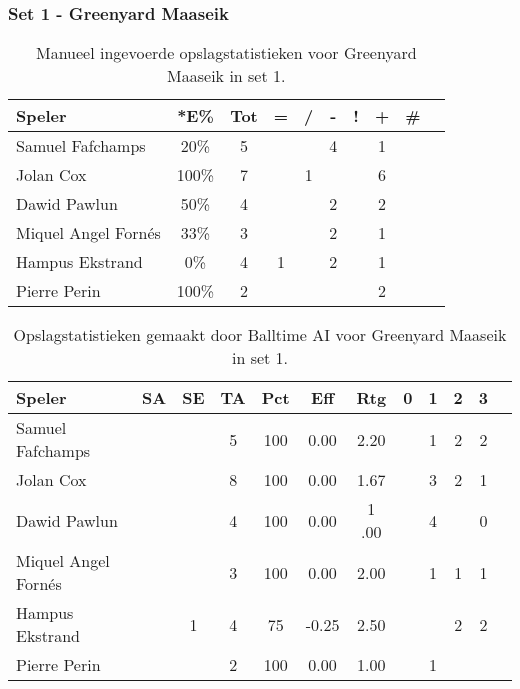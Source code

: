 \subsubsection{Set 1 - Greenyard Maaseik}
\label{sec:PL3_Greenyard1}


\begin{table}[ht!]
    \centering
    \scriptsize
    \begin{tabular}{|l|c|c|c|c|c|c|c|c|c|} \hline
        \textbf{Speler} & *E\% & Tot & = & / & - & ! & + & \# \\ \hline
        Samuel Fafchamps & 20\% & 5 &  & & 4 &  & 1 &  \\ 
        Jolan Cox & 100\% & 7 &  & 1 &  & & 6 &  \\ 
        Dawid Pawlun & 50\% & 4 &  &  & 2 & & 2 &  \\
        Miquel Angel Fornés & 33\% & 3 &  & & 2 &  & 1 &  \\
        Hampus Ekstrand & 0\% & 4 & 1 &  & 2 &  & 1 & \\ 
        Pierre Perin & 100\% & 2 &  &  &  & & 2 &  \\ \hline
    \end{tabular}
    \caption[Manueel ingevoerde opslagstatistieken voor Greenyard Maaseik in set 1]{\label{tab:PL3ServeMaaseikMan1}Manueel ingevoerde opslagstatistieken voor Greenyard Maaseik in set 1.}
\end{table}

\begin{table}[ht!]
  \centering
  \scriptsize
  \begin{tabular}{|l|c|c|c|c|c|c|c|c|c|c|c|} \hline
    \textbf{Speler} & SA & SE & TA & Pct & Eff & Rtg & 0 & 1 & 2 & 3 \\ \hline
    Samuel Fafchamps &  &  & 5 & 100 & 0.00 & 2.20 &   & 1 & 2 & 2 \\
    Jolan Cox &  &  & 8 & 100 & 0.00 & 1.67 &   & 3 & 2 & 1 \\
    Dawid Pawlun &  &  & 4 & 100 & 0.00 & 1 .00 &   & 4 &  & 0 \\
    Miquel Angel Fornés &  &  & 3 & 100 & 0.00 & 2.00 &  & 1 & 1 & 1 \\
    Hampus Ekstrand &  & 1 & 4 & 75 & -0.25 & 2.50 &   & & 2 & 2 \\
    Pierre Perin & & & 2 & 100 & 0.00 & 1.00 &   & 1 &   &  \\  \hline
  \end{tabular}
  \caption[Opslagstatistieken gemaakt door Balltime AI voor Greenyard Maaseik in set 1]{\label{tab:PL3ServeMaaseikAI1}Opslagstatistieken gemaakt door Balltime AI voor Greenyard Maaseik in set 1.}
\end{table}

